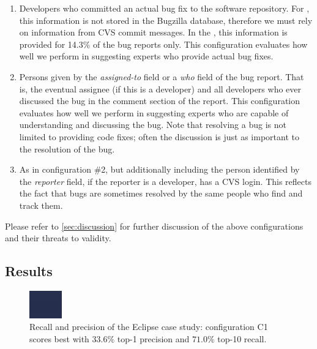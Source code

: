 \documentclass[10pt]{book}
\begin{document}
\begin{enumerate}
\item Developers who committed an actual bug fix to the software repository. For \EC, this information is not stored in the Bugzilla database, therefore we must rely on information from CVS commit messages. In the \validationset, this information is provided for 14.3\% of the bug reports only. This configuration evaluates how well we perform in suggesting experts who provide actual bug fixes.
\item Persons given by the \emph{assigned-to} field or a \emph{who} field of the bug report. That is, the eventual assignee (if this is a developer) and all developers who ever discussed the bug in the comment section of the report. This configuration evaluates how well we perform in suggesting experts who are capable of understanding and discussing the bug. Note that resolving a bug is not limited to providing code fixes; often the discussion is just as important to the resolution of the bug. 
\item As in configuration \#2, but additionally including the person identified by the \emph{reporter} field, if the reporter is a developer, \ie has a CVS login.  This reflects the fact that bugs are sometimes resolved by the same people who find and track them.
\end{enumerate}

Please refer to \autoref{sec:discussion} for further discussion of the above configurations and their threats to validity.

\subsection{Results}\label{therealthing}

\begin{figure}
    \includegraphics[width=\linewidth]{runOnTestSet}
    \caption{Recall and precision of the Eclipse case study: configuration C1 scores best with $33.6\%$ top-1 precision and $71.0\%$ top-10 recall.}
    \label{fig:eclipse}
\end{figure} 
\end{document}
